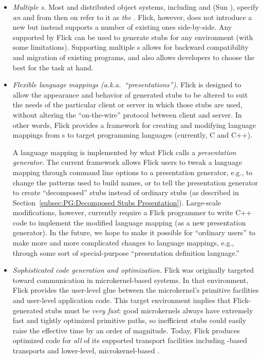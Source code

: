 \begin{itemize}
  \item \emph{Multiple \IDL{}s.}
  Most \RPC{} and distributed object systems, including \CORBA{} and \ONCRPC{}
  (Sun \RPC{}), specify \emph{an} \IDL{} and from then on refer to it as
  \emph{the} \IDL{}\@.  Flick, however, does not introduce a new \IDL{} but
  instead supports a number of existing ones side-by-side.  Any \IDL{}
  supported by Flick can be used to generate stubs for any environment (with
  some limitations).  Supporting multiple \IDL{}s allows for backward
  compatibility and migration of existing programs, and also allows developers
  to choose the best \IDL{} for the task at hand.

  \item \emph{Flexible language mappings (a.k.a.\ ``presentations'').}
  Flick is designed to allow the appearance and behavior of generated stubs to
  be altered to suit the needs of the particular client or server in which
  those stubs are used, without altering the ``on-the-wire'' protocol between
  client and server.  In other words, Flick provides a framework for creating
  and modifying language mappings from \IDL{}s to target programming languages
  (currently, C and C++).

  A language mapping is implemented by what Flick calls a \emph{presentation
  generator}.  The current framework allows Flick users to tweak a language
  mapping through command line options to a presentation generator, e.g., to
  change the patterns used to build names, or to tell the presentation
  generator to create ``decomposed'' stubs instead of ordinary stubs (as
  described in Section~\ref{subsec:PG:Decomposed Stubs Presentation}).
  Large-scale modifications, however, currently require a Flick programmer to
  write C++ code to implement the modified language mapping (as a new
  presentation generator).  In the future, we hope to make it possible for
  ``ordinary users'' to make more and more complicated changes to language
  mappings, e.g., through some sort of special-purpose ``presentation
  definition language.''

  \item \emph{Sophisticated code generation and optimization.}
  Flick was originally targeted toward communication in microkernel-based
  systems.  In that environment, Flick provides the user-level glue between the
  microkernel's primitive \IPC{} facilities and user-level application code.
  This target environment implies that Flick-generated stubs must be \emph{very
  fast}: good microkernels always have extremely fast and tightly optimized
  primitive \IPC{} paths, so inefficient stubs could easily raise the effective
  \IPC{} time by an order of magnitude.  Today, Flick produces optimized code
  for \emph{all} of its supported transport facilities including \TCP{}-based
  transports and lower-level, microkernel-based \IPC{}\@.


\end{itemize}
